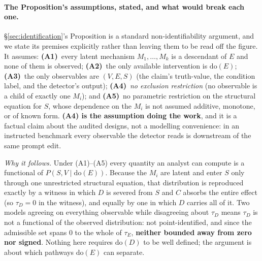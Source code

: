 \paragraph{The Proposition's assumptions, stated, and what would break each one.} §\ref{sec:identification}'s Proposition is a standard non-identifiability argument, and we state its premises explicitly rather than leaving them to be read off the figure. It assumes: \textbf{(A1)}~every latent mechanism $M_1,\dots,M_k$ is a descendant of $E$ and none of them is observed; \textbf{(A2)}~the only available intervention is $\mathrm{do}(E)$; \textbf{(A3)}~the only observables are $(V,E,S)$ (the claim's truth-value, the condition label, and the detector's output); \textbf{(A4)}~\emph{no exclusion restriction} (no observable is a child of exactly one $M_i$); and \textbf{(A5)}~no parametric restriction on the structural equation for $S$, whose dependence on the $M_i$ is not assumed additive, monotone, or of known form. \textbf{(A4) is the assumption doing the work}, and it is a factual claim about the audited designs, not a modelling convenience: in an instructed benchmark every observable the detector reads is downstream of the same prompt edit.

\emph{Why it follows.} Under (A1)--(A5) every quantity an analyst can compute is a functional of $P(S,V \mid \mathrm{do}(E))$. Because the $M_i$ are latent and enter $S$ only through one unrestricted structural equation, that distribution is reproduced exactly by a witness in which $D$ is severed from $S$ and $C$ absorbs the entire effect (so $\tau_D\!=\!0$ in the witness), and equally by one in which $D$ carries all of it. Two models agreeing on everything observable while disagreeing about $\tau_D$ means $\tau_D$ is not a functional of the observed distribution: not point-identified, and since the admissible set spans $0$ to the whole of $\tau_E$, \textbf{neither bounded away from zero nor signed}. Nothing here requires $\mathrm{do}(D)$ to be well defined; the argument is about which pathways $\mathrm{do}(E)$ can separate.

